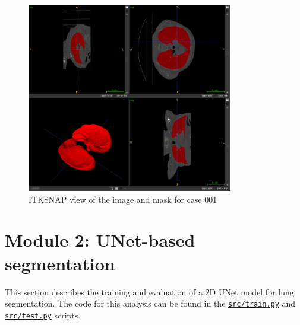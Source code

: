 \documentclass[11pt]{article}
\begin{document}
\begin{figure}[H]
    \centering
    \includegraphics[width=0.8\textwidth]{figs/itksnap.png}
    \caption{ITKSNAP view of the image and mask for case 001}
    \label{fig:itksnap}
\end{figure}


\section{Module 2: UNet-based segmentation}
This section describes the training and evaluation of a 2D UNet model for lung segmentation. The code for this analysis can be found in the \texttt{\url{src/train.py}} and \texttt{\url{src/test.py}} scripts. 
\end{document}
